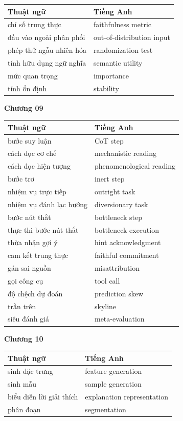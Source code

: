 \begin{tabular}{@{}lp{7cm}@{}}
\toprule
Thuật ngữ & Tiếng Anh \\
\midrule
chỉ số trung thực & faithfulness metric \\
đầu vào ngoài phân phối & out-of-distribution input \\
phép thử ngẫu nhiên hóa & randomization test \\
tính hữu dụng ngữ nghĩa & semantic utility \\
mức quan trọng & importance \\
tính ổn định & stability \\
\bottomrule
\end{tabular}

\medskip

\textbf{Chương 09}

\begin{tabular}{@{}lp{7cm}@{}}
\toprule
Thuật ngữ & Tiếng Anh \\
\midrule
bước suy luận & CoT step \\
cách đọc cơ chế & mechanistic reading \\
cách đọc hiện tượng & phenomenological reading \\
bước trơ & inert step \\
nhiệm vụ trực tiếp & outright task \\
nhiệm vụ đánh lạc hướng & diversionary task \\
bước nút thắt & bottleneck step \\
thực thi bước nút thắt & bottleneck execution \\
thừa nhận gợi ý & hint acknowledgment \\
cam kết trung thực & faithful commitment \\
gán sai nguồn & misattribution \\
gọi công cụ & tool call \\
độ chệch dự đoán & prediction skew \\
trần trên & skyline \\
siêu đánh giá & meta-evaluation \\
\bottomrule
\end{tabular}

\medskip

\textbf{Chương 10}

\begin{tabular}{@{}lp{7cm}@{}}
\toprule
Thuật ngữ & Tiếng Anh \\
\midrule
sinh đặc trưng & feature generation \\
sinh mẫu & sample generation \\
biểu diễn lời giải thích & explanation representation \\
phân đoạn & segmentation \\
\bottomrule
\end{tabular}

